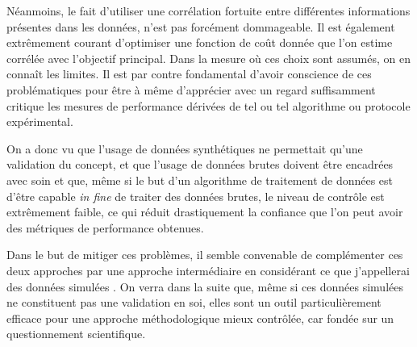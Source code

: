 Néanmoins, le fait d'utiliser une corrélation fortuite entre différentes informations présentes dans les données, n'est pas forcément dommageable. Il est également extrêmement courant d'optimiser une fonction de coût donnée que l'on estime corrélée avec l'objectif principal. Dans la mesure où ces choix sont assumés, on en connaît les limites. Il est par contre fondamental d'avoir conscience de ces problématiques pour être à même d'apprécier avec un regard suffisamment critique les mesures de performance dérivées de tel ou tel algorithme ou protocole expérimental\cite{lagrangehal-01635373}.

On a donc vu que l'usage de données synthétiques ne permettait qu'une validation du concept, et que l'usage de données brutes doivent être encadrées avec soin et que, même si le but d'un algorithme de traitement de données est d'être capable \textit{in fine} de traiter des données brutes, le niveau de contrôle est extrêmement faible, ce qui réduit drastiquement la confiance que l'on peut avoir des métriques de performance obtenues.

Dans le but de mitiger ces problèmes, il semble convenable de complémenter ces deux approches par une approche intermédiaire en considérant ce que j'appellerai des données \og simulées \fg. On verra dans la suite que, même si ces données simulées ne constituent pas une validation en soi, elles sont un outil particulièrement efficace pour une approche méthodologique mieux contrôlée, car fondée sur un questionnement scientifique.

